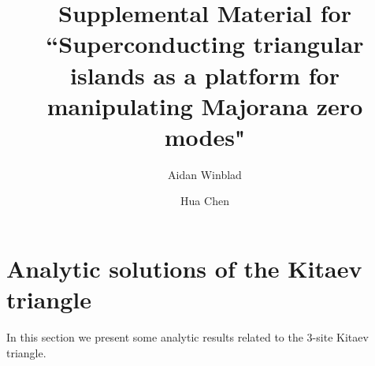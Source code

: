 \documentclass[aps,prb,showpacs,amsmath,amssymb,superscriptaddress]{revtex4-2}
\begin{document}
\title{Supplemental Material for ``Superconducting triangular islands as a platform for manipulating Majorana zero modes"}

\author{Aidan Winblad}

\author{Hua Chen}

\maketitle

\section{Analytic solutions of the Kitaev triangle}
In this section we present some analytic results related to the 3-site Kitaev triangle. 
\end{document}
